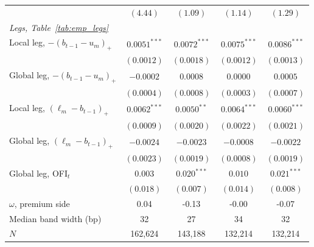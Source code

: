\begin{tabular}{lcccc}
 & $(4.44)$ & $(1.09)$ & $(1.14)$ & $(1.29)$ \\
\emph{Legs, Table~\ref{tab:emp_legs}} & & & & \\
Local leg, $-(b_{t-1}-u_m)_+$ & $0.0051^{***}$ & $0.0072^{***}$ & $0.0075^{***}$ & $0.0086^{***}$ \\
 & $(0.0012)$ & $(0.0018)$ & $(0.0012)$ & $(0.0013)$ \\
Global leg, $-(b_{t-1}-u_m)_+$ & $-0.0002$ & $0.0008$ & $0.0000$ & $0.0005$ \\
 & $(0.0004)$ & $(0.0008)$ & $(0.0003)$ & $(0.0007)$ \\
Local leg, $(\ell_m-b_{t-1})_+$ & $0.0062^{***}$ & $0.0050^{**}$ & $0.0064^{***}$ & $0.0060^{***}$ \\
 & $(0.0009)$ & $(0.0020)$ & $(0.0022)$ & $(0.0021)$ \\
Global leg, $(\ell_m-b_{t-1})_+$ & $-0.0024$ & $-0.0023$ & $-0.0008$ & $-0.0022$ \\
 & $(0.0023)$ & $(0.0019)$ & $(0.0008)$ & $(0.0019)$ \\
Global leg, OFI$_t$ & $0.003$ & $0.020^{***}$ & $0.010$ & $0.021^{***}$ \\
 & $(0.018)$ & $(0.007)$ & $(0.014)$ & $(0.008)$ \\
\midrule
$\omega$, premium side & 0.04 & -0.13 & -0.00 & -0.07 \\
Median band width (bp) & 32 & 27 & 34 & 32 \\
$N$ & 162,624 & 143,188 & 132,214 & 132,214 \\
\bottomrule
\end{tabular}

